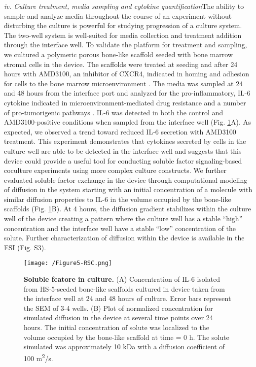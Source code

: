 \textit{iv. Culture treatment, media sampling and cytokine quantification}The ability to sample and analyze media throughout the course of an experiment without disturbing the culture is powerful for studying progression of a culture system. The two-well system is well-suited for media collection and treatment addition through the interface well. To validate the platform for treatment and sampling, we cultured a polymeric porous bone-like scaffold seeded with bone marrow stromal cells in the device. The scaffolds were treated at seeding and after 24 hours with AMD3100, an inhibitor of CXCR4, indicated in homing and adhesion for cells to the bone marrow microenvironment \cite{Alsayed2007, Burger2006}. The media was sampled at 24 and 48 hours from the interface port and analyzed for the pro-inflammatory, IL-6 cytokine indicated in microenvironment-mediated drug resistance and a number of pro-tumorigenic pathways \cite{Hodge2005, Roodman2001a, Vincent2005, Lin2007}. IL-6 was detected in both the control and AMD3100-positive conditions when sampled from the interface well (Fig. \ref{figure:Fig5}A). As expected, we observed a trend toward reduced IL-6 secretion with AMD3100 treatment. This experiment demonstrates that cytokines secreted by cells in the culture well are able to be detected in the interface well and suggests that this device could provide a useful tool for conducting soluble factor signaling-based coculture experiments using more complex culture constructs. We further evaluated soluble factor exchange in the device through computational modeling of diffusion in the system starting with an initial concentration of a molecule with similar diffusion properties to IL-6 in the volume occupied by the bone-like scaffolds (Fig. \ref{figure:Fig5}B). At 4 hours, the diffusion gradient stabilizes within the culture well of the device creating a pattern where the culture well has a stable “high” concentration and the interface well have a stable “low” concentration of the solute. Further characterization of diffusion within the device is available in the ESI (Fig. S3).    

\begin{figure}[ht] %
\centering
\texttt{[image: /Figure5-RSC.png]}
\caption{\textbf{Soluble fcatore in culture.} (A) Concentration of IL-6 isolated from HS-5-seeded bone-like scaffolds cultured in device taken from the interface well at 24 and 48 hours of culture. Error bars represent the SEM of 3-4 wells. (B) Plot of normalized concentration for simulated diffusion in the device at several time points over 24 hours. The initial concentration of solute was localized to the volume occupied by the bone-like scaffold at time = 0 h. The solute simulated was approximately 10 kDa with a diffusion coefficient of 100 \textmu m\textsuperscript{2}/s.}
\label{figure:Fig5}
\end{figure}


